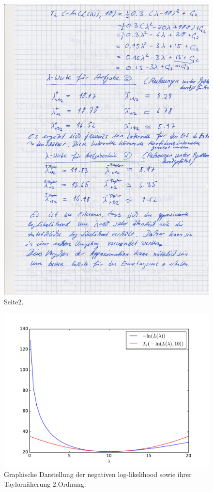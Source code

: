 \begin{figure}
  \includegraphics[width=\textwidth]{blatt9p2.jpg}
  \caption{Seite2.}
  \label{fig2}
\end{figure}

\FloatBarrier
\begin{figure}
  \includegraphics[width=\textwidth]{smdblatt9plot1.pdf}
  \caption{Graphische Darstellung der negativen log-likelihood sowie ihrer Taylornäherung 2.Ordnung.}
  \label{fig3}
\end{figure}

\FloatBarrier
